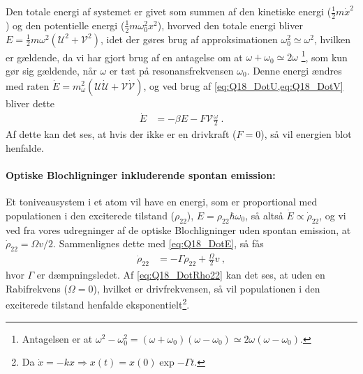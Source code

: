 Den totale energi af systemet er givet som summen af den kinetiske energi ($\frac{1}{2}m\Dot{x}^2$) og den potentielle energi ($\frac{1}{2}m\omega_0^2x^2$), hvorved den totale energi bliver $E = \frac{1}{2}m\omega^2(\mathcal{U}^2 + \mathcal{V}^2)$, idet der gøres brug af approksimationen $\omega_0^2 \simeq \omega^2$, hvilken er gældende, da vi har gjort brug af en antagelse om at $\omega + \omega_0 \simeq 2\omega$ \footnote{Antagelsen er at $\omega^2 - \omega_0^2 = (\omega + \omega_0)(\omega - \omega_0) \simeq 2\omega(\omega - \omega_0)$.}, som kun gør sig gældende, når $\omega$ er tæt på resonansfrekvensen $\omega_0$. Denne energi ændres med raten $\Dot{E} = m_\omega^2(\mathcal{U}\Dot{\mathcal{U}} + \mathcal{V}\Dot{\mathcal{V}})$, og ved brug af \cref{eq:Q18_DotU,eq:Q18_DotV} bliver dette
\begin{align} \label{eq:Q18_DotE}
    \Dot{E} &= -\beta E - F \mathcal{V}\frac{\omega}{2} \: .
\end{align}
Af dette kan det ses, at hvis der ikke er en drivkraft ($F = 0$), så vil energien blot henfalde.


\paragraph{Optiske Blochligninger inkluderende spontan emission:} Et toniveausystem i et atom vil have en energi, som er proportional med populationen i den exciterede tilstand ($\rho_{22}$), $E = \rho_{22}\hbar\omega_0$, så altså $\Dot{E} \propto \Dot{\rho}_{22}$, og vi ved fra vores udregninger af de optiske Blochligninger uden spontan emission, at $\Dot{\rho}_{22} = \Omega v/2$. Sammenlignes dette med \cref{eq:Q18_DotE}, så fås
\begin{align} \label{eq:Q18_DotRho22}
    \Dot{\rho}_{22} &= -\Gamma\rho_{22} + \frac{\Omega}{2}v \: ,
\end{align}
hvor $\Gamma$ er dæmpningsledet. Af \cref{eq:Q18_DotRho22} kan det ses, at uden en Rabifrekvens ($\Omega = 0$), hvilket er drivfrekvensen, så vil populationen i den exciterede tilstand henfalde eksponentielt\footnote{Da $\Dot{x} = -kx \Rightarrow x(t) = x(0)\exp{-\Gamma t}$.}.

